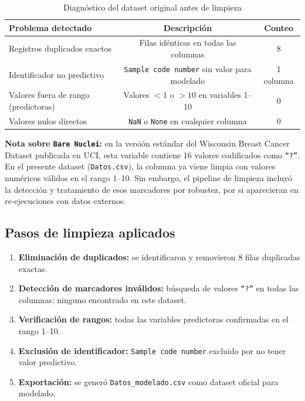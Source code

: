 \documentclass[11pt,a4paper]{article}
\begin{document}
\begin{table}[H]
\centering
\caption{Diagnóstico del dataset original antes de limpieza}
\begin{tabular}{lcc}
\toprule
\textbf{Problema detectado} & \textbf{Descripción} & \textbf{Conteo} \\
\midrule
Registros duplicados exactos & Filas idénticas en todas las columnas & 8 \\
Identificador no predictivo & \texttt{Sample code number} sin valor para modelado & 1 columna \\
Valores fuera de rango (predictoras) & Valores $< 1$ o $> 10$ en variables 1--10 & 0 \\
Valores nulos directos & \texttt{NaN} o \texttt{None} en cualquier columna & 0 \\
\bottomrule
\end{tabular}
\end{table}

\noindent\textbf{Nota sobre \texttt{Bare Nuclei}:} en la versión estándar del Wisconsin Breast Cancer Dataset publicada en UCI, esta variable contiene 16 valores codificados como \texttt{``?''}. En el presente dataset (\texttt{Datos.csv}), la columna ya viene limpia con valores numéricos válidos en el rango 1--10. Sin embargo, el pipeline de limpieza incluyó la detección y tratamiento de esos marcadores por robustez, por si aparecieran en re-ejecuciones con datos externos.

\subsection{Pasos de limpieza aplicados}

\begin{enumerate}[leftmargin=1.4cm]
\item \textbf{Eliminación de duplicados:} se identificaron y removieron 8 filas duplicadas exactas.
\item \textbf{Detección de marcadores inválidos:} búsqueda de valores \texttt{``?''} en todas las columnas; ninguno encontrado en este dataset.
\item \textbf{Verificación de rangos:} todas las variables predictoras confirmadas en el rango 1--10.
\item \textbf{Exclusión de identificador:} \texttt{Sample code number} excluido por no tener valor predictivo.
\item \textbf{Exportación:} se generó \texttt{Datos\_modelado.csv} como dataset oficial para modelado.
\end{enumerate}
\end{document}
